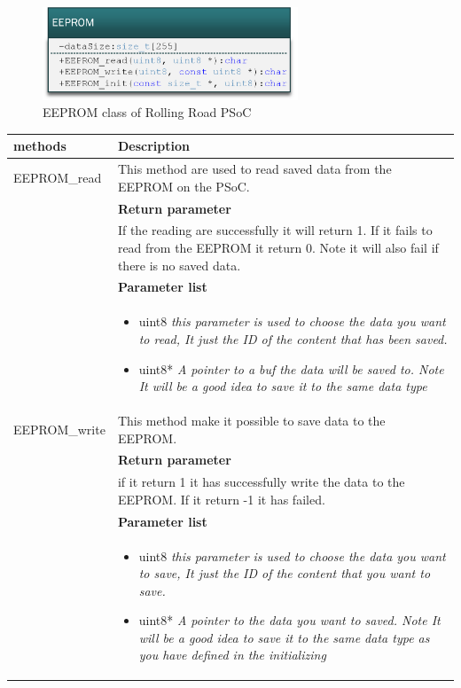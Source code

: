 \begin{figure}[H]
	\centering
	\includegraphics [width=3in]{Software/Pictures/klassediagram_EEPROM.png}
	\caption{EEPROM class of Rolling Road PSoC}
	\label{fig:Class_diagram_EEPROM_RR_PSoC}
\end{figure}


\begin{table}[h!]
	\centering
	\begin{tabular}{|p{5 cm}|p{10 cm}|}
		\hline
		\textbf{methods} & \textbf{Description} \\ \hline
		
		EEPROM\_read
		& This method are used to read saved data from the EEPROM on the PSoC.
		\\ & \textbf{Return parameter}
		\\ & If the reading are successfully it will return 1. If it fails to read from the EEPROM it return 0. Note it will also fail if there is no saved data.
		\\ & \textbf{Parameter list}
		\\ & \begin{itemize}
			\item {\large uint8}
			\subitem \textit{this parameter is used to choose the data you want to read, It just the ID of the content that has been saved.}
			\item {\large uint8*}
			\subitem \textit{A pointer to a buf the data will be saved to. Note It will be a good idea to save it to the same data type}
		\end{itemize}
		\\ \hline
		
		EEPROM\_write
		& This method make it possible to save data to the EEPROM.
		\\ & \textbf{Return parameter}
		\\ & if it return 1 it has successfully write the data to the EEPROM. If it return -1 it has failed.
		\\ & \textbf{Parameter list}
		\\ & \begin{itemize}
			\item {\large uint8}
			\subitem \textit{this parameter is used to choose the data you want to save, It just the ID of the content that you want to save.}
			\item {\large uint8*}
			\subitem \textit{A pointer to the data you want to saved. Note It will be a good idea to save it to the same data type as you have defined in the initializing}
		\end{itemize}
		\\ \hline
		

\end{tabular}
\end{table}
